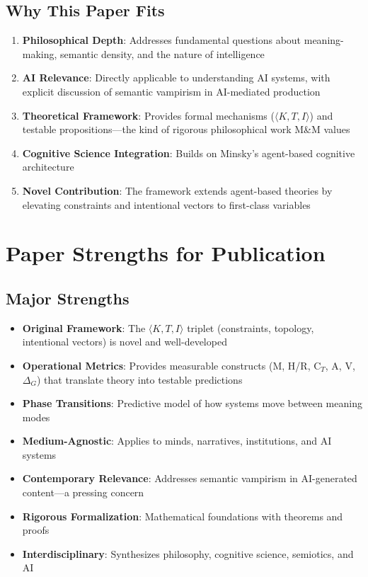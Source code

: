 \documentclass[12pt]{article}
\begin{document}
\subsection{Why This Paper Fits}

\begin{enumerate}[leftmargin=*]
\item \textbf{Philosophical Depth}: Addresses fundamental questions about meaning-making, semantic density, and the nature of intelligence
\item \textbf{AI Relevance}: Directly applicable to understanding AI systems, with explicit discussion of semantic vampirism in AI-mediated production
\item \textbf{Theoretical Framework}: Provides formal mechanisms ($\langle K, T, I \rangle$) and testable propositions—the kind of rigorous philosophical work M\&M values
\item \textbf{Cognitive Science Integration}: Builds on Minsky's agent-based cognitive architecture
\item \textbf{Novel Contribution}: The framework extends agent-based theories by elevating constraints and intentional vectors to first-class variables
\end{enumerate}

\section{Paper Strengths for Publication}

\subsection{Major Strengths}

\begin{itemize}[leftmargin=*]
\item \textbf{Original Framework}: The $\langle K, T, I \rangle$ triplet (constraints, topology, intentional vectors) is novel and well-developed
\item \textbf{Operational Metrics}: Provides measurable constructs (M, H/R, C$_T$, A, V, $\Delta_G$) that translate theory into testable predictions
\item \textbf{Phase Transitions}: Predictive model of how systems move between meaning modes
\item \textbf{Medium-Agnostic}: Applies to minds, narratives, institutions, and AI systems
\item \textbf{Contemporary Relevance}: Addresses semantic vampirism in AI-generated content—a pressing concern
\item \textbf{Rigorous Formalization}: Mathematical foundations with theorems and proofs
\item \textbf{Interdisciplinary}: Synthesizes philosophy, cognitive science, semiotics, and AI
\end{itemize}
\end{document}
